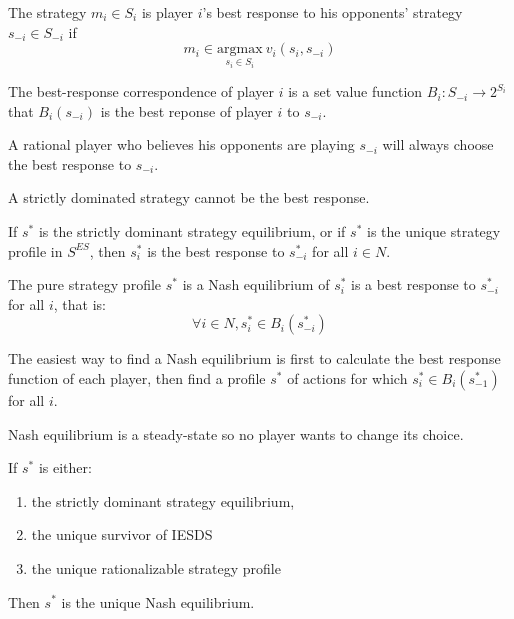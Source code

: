 \begin{definition}
    The strategy $m_i \in S_i$ is player $i$'s best response to his opponents' strategy $s_{-i} \in S_{-i}$ if
    \begin{equation*}
        m_i \in \underset{s_i \in S_i}{\text{argmax}}\ v_i (s_i, s_{-i})
    \end{equation*}
\end{definition}

\begin{definition}
    The best-response correspondence of player $i$ is a set value function $B_i: S_{-i} \rightarrow 2^{S_i}$ that $B_i(s_{-i})$ is the best reponse of player $i$ to $s_{-i}$.
\end{definition}


\begin{theorem}
    A rational player who believes his opponents are playing $s_{-i}$ will always choose the best response to $s_{-i}$.
\end{theorem}

\begin{theorem}
    A strictly dominated strategy cannot be the best response.    
\end{theorem}

\begin{theorem}
    If $s^*$ is the strictly dominant strategy equilibrium, or if $s^*$ is the unique strategy profile in $S^{ES}$, then $s_i^*$ is the best response to $s_{-i}^*$ for all $i \in N$.
\end{theorem}


\begin{definition}
    The pure strategy profile $s^*$ is a Nash equilibrium of $s_i^*$ is a best response to $s_{-i}^*$ for all $i$, that is:
    \begin{equation*}
        \forall i \in N, s_i^* \in B_i (s_{-i}^*)
    \end{equation*}
\end{definition}

The easiest way to find a Nash equilibrium is first to calculate the best response function of each player, then find a profile $s^*$ of actions for which $s_i^* \in B_i(s_{-1}^*)$ for all $i$.


Nash equilibrium is a steady-state so no player wants to change its choice.

\begin{theorem}
    If $s^*$ is either:
    \begin{enumerate}
        \item the strictly dominant strategy equilibrium,
        \item the unique survivor of IESDS
        \item the unique rationalizable strategy profile
    \end{enumerate}    
    Then $s^*$ is the unique Nash equilibrium.
\end{theorem}

